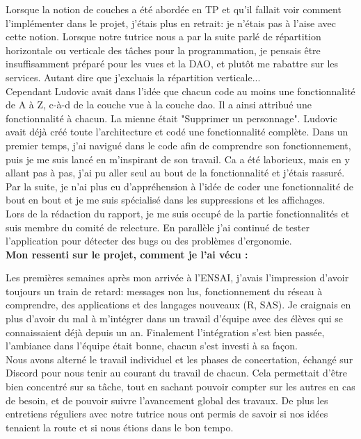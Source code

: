 \documentclass[11pt]{article}
\begin{document}
Lorsque la notion de couches a été abordée en TP et qu'il fallait voir comment l'implémenter dans le projet, j'étais plus en retrait: je n'étais pas à l'aise avec cette notion. Lorsque notre tutrice nous a par la suite parlé de répartition horizontale ou verticale des tâches pour la programmation, je pensais être insuffisamment préparé pour les vues et la DAO, et plutôt me rabattre sur les services. Autant dire que j'excluais la répartition verticale...\\

Cependant Ludovic avait dans l'idée que chacun code au moins une fonctionnalité de A à Z, c-à-d de la couche vue à la couche dao. Il a ainsi attribué une fonctionnalité à chacun. La mienne était "Supprimer un personnage". Ludovic avait déjà créé toute l'architecture et codé une fonctionnalité complète. Dans un premier temps, j'ai navigué dans le code afin de comprendre son fonctionnement, puis je me suis lancé en m'inspirant de son travail. Ca a été laborieux, mais en y allant pas à pas, j'ai pu aller seul au bout de la fonctionnalité et j'étais rassuré. Par la suite, je n'ai plus eu d'appréhension à l'idée de coder une fonctionnalité de bout en bout et je me suis spécialisé dans les suppressions et les affichages.\\

Lors de la rédaction du rapport, je me suis occupé de la partie fonctionnalités et suis membre du comité de relecture. En parallèle j'ai continué de tester l'application pour détecter des bugs ou des problèmes d'ergonomie.\\

\bigbreak
\textbf{ Mon ressenti sur le projet, comment je l’ai vécu :  }

Les premières semaines après mon arrivée à l'ENSAI, j'avais l'impression d'avoir toujours un train de retard: messages non lus, fonctionnement du réseau à comprendre, des applications et des langages nouveaux (R, SAS). Je craignais en plus d'avoir du mal à m'intégrer dans un travail d'équipe avec des élèves qui se connaissaient déjà depuis un an. Finalement l'intégration s'est bien passée, l'ambiance dans l'équipe était bonne, chacun s'est investi à sa façon.\\
Nous avons alterné le travail individuel et les phases de concertation, échangé sur Discord pour nous tenir au courant du travail de chacun. Cela permettait d'être bien concentré sur sa tâche, tout en sachant pouvoir compter sur les autres en cas de besoin, et de pouvoir suivre l'avancement global des travaux. De plus les entretiens réguliers avec notre tutrice nous ont permis de savoir si nos idées tenaient la route et si nous étions dans le bon tempo.\\
\end{document}
